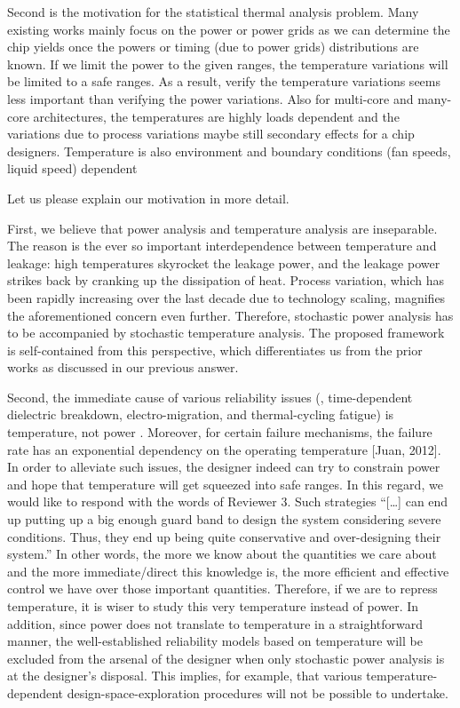 \begin{reviewer}
Second is the motivation for the statistical thermal analysis problem. Many existing works mainly focus on the power or power grids as we can determine the chip yields once the powers or timing (due to power grids) distributions are known. If we limit the power to the given ranges, the temperature variations will be limited to a safe ranges. As a result, verify the temperature variations seems less important than verifying the power variations. Also for multi-core and many-core architectures, the temperatures are highly loads dependent and the variations due to process variations maybe still secondary effects for a chip designers. Temperature is also environment and boundary conditions (fan speeds, liquid speed) dependent
\end{reviewer}
\begin{authors}
Let us please explain our motivation in more detail.

First, we believe that power analysis and temperature analysis are inseparable.
The reason is the ever so important interdependence between temperature and leakage: high temperatures skyrocket the leakage power, and the leakage power strikes back by cranking up the dissipation of heat.
Process variation, which has been rapidly increasing over the last decade due to technology scaling, magnifies the aforementioned concern even further.
Therefore, stochastic power analysis has to be accompanied by stochastic temperature analysis.
The proposed framework is self-contained from this perspective, which differentiates us from the prior works as discussed in our previous answer.

Second, the immediate cause of various reliability issues (\eg, time-dependent dielectric breakdown, electro-migration, and thermal-cycling fatigue) is temperature, not power \perse.
Moreover, for certain failure mechanisms, the failure rate has an exponential dependency on the operating temperature [Juan, 2012].
In order to alleviate such issues, the designer indeed can try to constrain power and hope that temperature will get squeezed into safe ranges.
In this regard, we would like to respond with the words of Reviewer 3.
Such strategies ``[\ldots] can end up putting up a big enough guard band to design the system considering severe conditions.
Thus, they end up being quite conservative and over-designing their system.''
In other words, the more we know about the quantities we care about and the more immediate/direct this knowledge is, the more efficient and effective control we have over those important quantities.
Therefore, if we are to repress temperature, it is wiser to study this very temperature instead of power.
In addition, since power does not translate to temperature in a straightforward manner, the well-established reliability models based on temperature will be excluded from the arsenal of the designer when only stochastic power analysis is at the designer's disposal.
This implies, for example, that various temperature-dependent design-space-exploration procedures will not be possible to undertake.


\end{authors}
